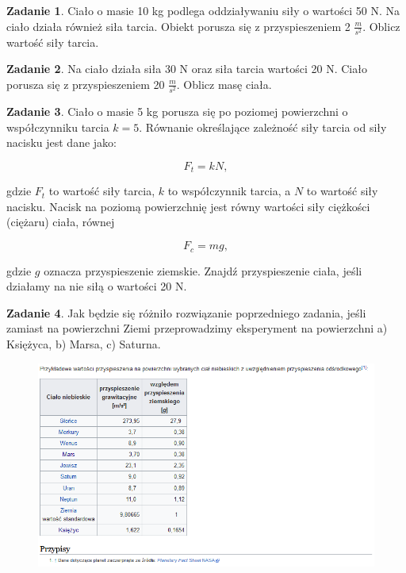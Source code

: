 \documentclass[11pt]{article}
\theoremstyle{definition}
\newtheorem{zad}{Zadanie}
\numberwithin{zad}{section}
\begin{document}
\begin{zad}
Ciało o masie 10 kg podlega oddziaływaniu siły o wartości 50 N. Na ciało działa również siła tarcia. Obiekt porusza się z przyspieszeniem 2 $\frac m{s^2}$. Oblicz wartość siły tarcia.
\end{zad}

\begin{zad}
Na ciało działa siła 30 N oraz siła tarcia wartości 20 N. Ciało porusza się z przyspieszeniem 20 $\frac m{s^2}$. Oblicz masę ciała.
\end{zad}

\begin{zad}
Ciało o masie 5 kg porusza się po poziomej powierzchni o współczynniku tarcia $k = 5$. Równanie określające zależność siły tarcia od siły nacisku jest dane jako:

$$F_t = kN,$$

gdzie $F_t$ to wartość siły tarcia, $k$ to współczynnik tarcia, a $N$ to wartość siły nacisku. Nacisk na poziomą powierzchnię jest równy wartości siły ciężkości (ciężaru) ciała, równej

$$F_c = mg,$$

gdzie $g$ oznacza przyspieszenie ziemskie. Znajdź przyspieszenie ciała, jeśli działamy na nie siłą o wartości 20 N.
\end{zad}

\begin{zad}
Jak będzie się różniło rozwiązanie poprzedniego zadania, jeśli zamiast na powierzchni Ziemi przeprowadzimy eksperyment na powierzchni a) Księżyca, b) Marsa, c) Saturna.

\begin{figure}[h]
\centering
\includegraphics[width=1\linewidth]{przyspieszenia.png}
\end{figure}
\end{zad}
\end{document}
